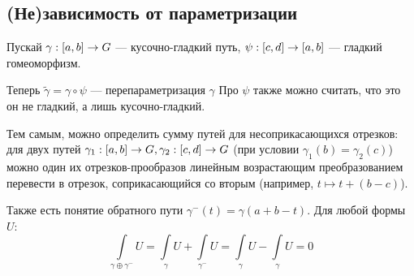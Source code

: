 \documentclass[a4paper]{report}
\begin{document}
    \subsection{(Не)зависимость от параметризации}
    Пускай $\gamma: [a, b] \rightarrow G$ --- кусочно-гладкий путь, $\psi: [c, d] \rightarrow [a, b]$ --- гладкий гомеоморфизм.

    Теперь $\tilde{\gamma} = \gamma \circ \psi$ --- перепараметризация $\gamma$
    Про $\psi$ также можно считать, что это он не гладкий, а лишь кусочно-гладкий.

    Тем самым, можно определить сумму путей для несоприкасающихся отрезков: для двух путей $\gamma_1: [a, b] \rightarrow G, \gamma_2: [c, d] \rightarrow G$ (при условии $\gamma_{1}(b) = \gamma_2(c)$) можно один их отрезков-прообразов линейным возрастающим преобразованием перевести в отрезок, соприкасающийся со вторым (например, $t \mapsto t + (b - c)$).

    Также есть понятие обратного пути $\gamma^-(t) = \gamma(a + b - t)$.
    Для любой формы $U$: \[\int\limits_{\gamma \oplus \gamma^-}U = \int\limits_{\gamma}U + \int\limits_{\gamma^-}U = \int\limits_{\gamma}U - \int\limits_{\gamma}U = 0\]
\end{document}
